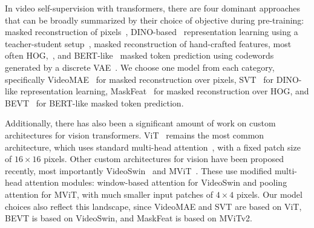 In video self-supervision with transformers, there are four dominant approaches that can be broadly summarized by their choice of objective during pre-training:
masked reconstruction of pixels~\cite{Tong2022VideoMAE, feichtenhofer2022maest, Wang2023VideoMAE2}, DINO-based~\cite{caron2021emerging} representation learning using a teacher-student setup~\cite{Ranasinghe2021SVT, wang2022mvd}, masked reconstruction of hand-crafted features, most often HOG,~\cite{Wei2022MaskFeat, sun2023mme}, and BERT-like~\cite{devlin2018bert} masked token prediction using codewords generated by a discrete VAE~\cite{Wang2021BEVT, tan2021VIMPAC}. We choose one model from each category, specifically VideoMAE~\cite{Tong2022VideoMAE} for masked reconstruction over pixels, SVT~\cite{Ranasinghe2021SVT} for DINO-like representation learning, MaskFeat~\cite{Wei2022MaskFeat} for masked reconstruction over HOG, and BEVT~\cite{Wang2021BEVT} for BERT-like masked token prediction.

Additionally, there has also been a significant amount of work on custom architectures for vision transformers. ViT~\cite{dosovitskiy2020image} remains the most common architecture, which uses standard multi-head attention~\cite{vaswani2017attention}, with a fixed patch size of $16 \times 16$ pixels. Other custom architectures for vision have been proposed recently, most importantly VideoSwin~\cite{liu2022video} and MViT~\cite{fan2021multiscale, li2022mvitv2}. These use modified multi-head attention modules: window-based attention for VideoSwin and pooling attention for MViT, with much smaller input patches of $4 \times 4$ pixels. Our model choices also reflect this landscape, since VideoMAE and SVT are based on ViT, BEVT is based on VideoSwin, and MaskFeat is based on MViTv2.
